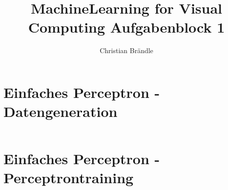\documentclass[]{report}
\title{MachineLearning for Visual Computing Aufgabenblock 1}
\author{Christian Br\"andle}
\begin{document}
\maketitle

\begin{abstract}
\end{abstract}

\section{Einfaches Perceptron - Datengeneration}

\begin{tabular}{| l | l |}


\end{tabular}

\section{Einfaches Perceptron - Perceptrontraining}
\end{document}
